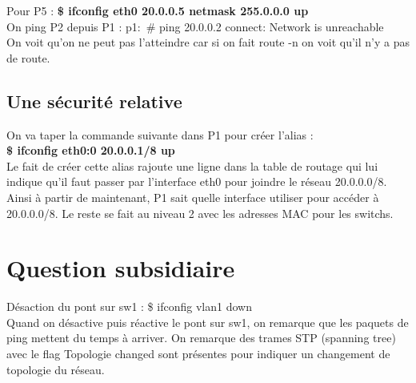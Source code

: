\documentclass[a4paper]{article}
\begin{document}
Pour P5 : \textbf{\$ ifconfig eth0 20.0.0.5 netmask 255.0.0.0 up} \\

On ping P2 depuis P1 :  p1:~\# ping 20.0.0.2  connect: Network is unreachable \\

On voit qu'on ne peut pas l'atteindre car si on fait route -n on voit qu'il n'y a pas de route. 
		
		\subsection{Une sécurité relative}
\noindent		
On va taper la commande suivante dans P1 pour créer l'alias :  \\
\textbf{\$ ifconfig eth0:0 20.0.0.1/8 up	} \\

Le fait de créer cette alias rajoute une ligne dans la table de routage qui lui indique qu'il faut passer par l'interface eth0 pour joindre le réseau 20.0.0.0/8. Ainsi à  partir de maintenant, P1 sait quelle interface utiliser pour accéder à 20.0.0.0/8. Le reste se fait au niveau 2 avec les adresses MAC pour les switchs. 

	\section{Question subsidiaire}

Désaction du pont sur sw1 : \$ ifconfig vlan1 down \\

Quand on désactive puis réactive le pont sur sw1, on remarque que les paquets de ping mettent du temps à arriver. On remarque des trames STP (spanning tree) avec le flag Topologie changed sont présentes pour indiquer un changement de topologie du réseau. \\

		
			
\end{document}
